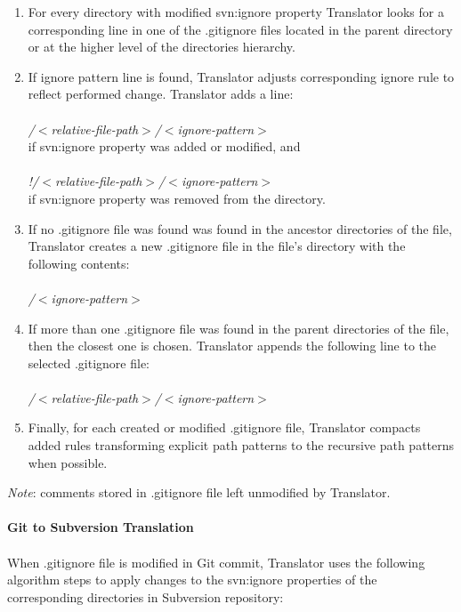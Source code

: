 \begin{enumerate}
\compactlist
\item For every directory with modified svn:ignore property Translator looks for a corresponding line in one of the 
.gitignore files located in the parent directory or at the higher level of the directories hierarchy.\\
\item If ignore pattern line is found, Translator adjusts corresponding ignore rule to reflect performed change. 
Translator adds a line:\\\\
\emph{/$<$relative-file-path$>$/$<$ignore-pattern$>$}\\
if svn:ignore property was added or modified, and \\\\
\emph{!/$<$relative-file-path$>$/$<$ignore-pattern$>$}\\
if svn:ignore property was removed from the directory.\\
\item If no .gitignore file was found was found in the ancestor directories of the file, Translator creates a new .gitignore file in the file's directory with the following contents:\\\\
\emph{/$<$ignore-pattern$>$}\\
\item 
If more than one .gitignore file was found in the parent directories of the file, then the closest one is chosen. 
Translator appends the following line to the selected .gitignore file:\\\\
\emph{/$<$relative-file-path$>$/$<$ignore-pattern$>$}\\
\item Finally, for each created or modified .gitignore file, Translator compacts added rules transforming 
explicit path patterns to the recursive path patterns when possible.
\end{enumerate}
\emph{Note}: comments stored in .gitignore file left unmodified by Translator.\\
\\
\textbf{Git to Subversion Translation}
\\\\
When .gitignore file is modified in Git commit, Translator uses the following algorithm steps to apply changes to the svn:ignore properties of the corresponding directories in Subversion repository:

